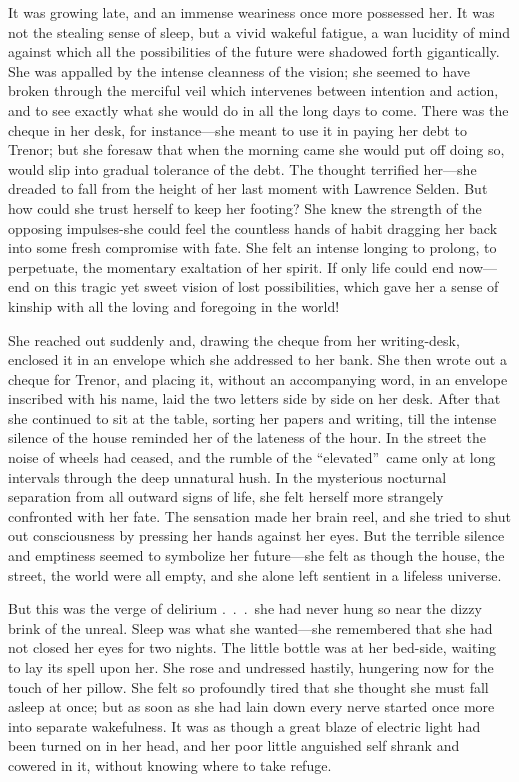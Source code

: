 \documentclass[12pt,a4paper]{book}
\begin{document}
It was growing late, and an immense weariness once more possessed
her. It was not the stealing sense of sleep, but a vivid wakeful
fatigue, a wan lucidity of mind against which all the
possibilities of the future were shadowed forth gigantically. She
was appalled by the intense cleanness of the vision; she seemed
to have broken through the merciful veil which intervenes between
intention and action, and to see exactly what she would do in all
the long days to come. There was the cheque in her desk, for
instance---she meant to use it in paying her debt to Trenor; but
she foresaw that when the morning came she would put off doing
so, would slip into gradual tolerance of the debt. The thought
terrified her---she dreaded to fall from the height of her last
moment with Lawrence Selden. But how could she trust herself to
keep her footing? She knew the strength of the opposing
impulses-she could feel the countless hands of habit dragging her
back into some fresh compromise with fate. She felt an intense
longing to prolong, to perpetuate, the momentary exaltation of
her spirit. If only life could end now---end on this tragic yet
sweet vision of lost possibilities, which gave her a sense of
kinship with all the loving and foregoing in the world!





She reached out suddenly and, drawing the cheque from her
writing-desk, enclosed it in an envelope which she addressed to
her bank. She then wrote out a cheque for Trenor, and placing it,
without an accompanying word, in an envelope inscribed with his
name, laid the two letters side by side on her desk. After that
she continued to sit at the table, sorting her papers and
writing, till the intense silence of the house reminded her of
the lateness of the hour. In the street the noise of wheels had
ceased, and the rumble of the ``elevated''\ came only at long
intervals through the deep unnatural hush. In the mysterious
nocturnal separation from all outward signs of life, she
felt herself more strangely confronted with her fate. The
sensation made her brain reel, and she tried to shut out
consciousness by pressing her hands against her eyes. But the
terrible silence and emptiness seemed to symbolize her
future---she felt as though the house, the street, the world were
all empty, and she alone left sentient in a lifeless universe.





But this was the verge of delirium .\ .\ .\ she had never hung so
near the dizzy brink of the unreal. Sleep was what she
wanted---she remembered that she had not closed her eyes for two
nights. The little bottle was at her bed-side, waiting to lay its
spell upon her. She rose and undressed hastily, hungering now for
the touch of her pillow. She felt so profoundly tired that she
thought she must fall asleep at once; but as soon as she had lain
down every nerve started once more into separate wakefulness. It
was as though a great blaze of electric light had been turned on
in her head, and her poor little anguished self shrank and
cowered in it, without knowing where to take refuge.
\end{document}
